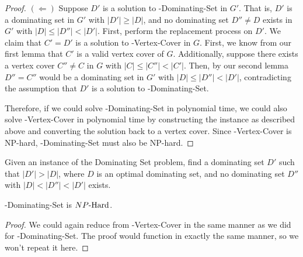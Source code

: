 \begin{proof}
$(\Leftarrow)$ Suppose $D'$ is a solution to \inob{}-Dominating-Set in $G'$. That is, $D'$ is a dominating set in $G'$ with $|D'| \geq |D|$, and no dominating set $D'' \neq D$ exists in $G'$ with $|D| \leq |D''| < |D'|$. First, perform the replacement process on $D'$. We claim that $C' = D'$ is a solution to \inob{}-Vertex-Cover in $G$. First, we know from our first lemma that $C'$ is a valid vertex cover of $G$.  Additionally, suppose there exists a vertex cover $C'' \neq C$ in $G$ with $|C| \leq |C''| < |C'|$. Then, by our second lemma $D'' = C''$ would be a dominating set in $G'$ with $|D| \leq |D''| < |D'|$, contradicting the assumption that $D'$ is a solution to \inob{}-Dominating-Set.

Therefore, if we could solve \inob{}-Dominating-Set in polynomial time, we could also solve \inob{}-Vertex-Cover in polynomial time by constructing the instance as described above and converting the solution back to a vertex cover. Since \inob{}-Vertex-Cover is NP-hard, \inob{}-Dominating-Set must also be NP-hard.
\end{proof}
\begin{definition}
Given an instance of the Dominating Set problem, find a dominating set $D'$ such that $|D'| > |D|$, where $D$ is an optimal dominating set, and no dominating set $D''$ with $|D| < |D''| < |D'|$ exists.
\end{definition}


\begin{theorem}
\exb{}-Dominating-Set is ${NP\text{-Hard{}}}$.
\end{theorem}
\begin{proof}
We could again reduce from \exb{}-Vertex-Cover in the same manner as we did for \inob{}-Dominating-Set. The proof would function in exactly the same manner, so we won't repeat it here.
\end{proof}


